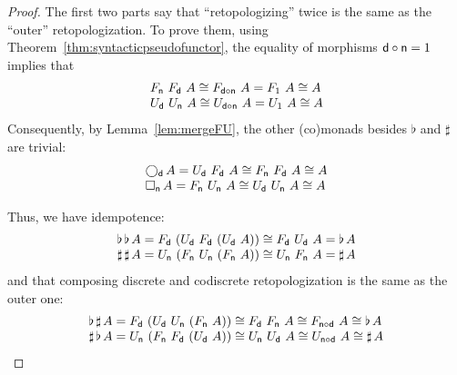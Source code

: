 \documentclass{drl-common/llncs}
\newcommand\compo[2]{\ensuremath{#1 \circ #2}}
\newcommand\F[2]{\ensuremath{F_{#1} \,\, #2}}
\newcommand\U[2]{\ensuremath{U_{#1} \,\, #2}}
\newcommand\Bx[2]{\ensuremath{\Box_{#1} \, {#2}}}
\newcommand\Crc[2]{\ensuremath{\bigcirc_{#1} \, {#2}}}
\newcommand\Flat[1]{\ensuremath{\flat \, {#1}}}
\newcommand\Sharp[1]{\ensuremath{\sharp \, {#1}}}
\begin{document}
\begin{proof}

The first two parts say that ``retopologizing'' twice is the same as the
``outer'' retopologization.  To prove them, using
Theorem~\ref{thm:syntacticpseudofunctor}, the equality of morphisms
$\compo{\dsd d}{\dsd n} = 1$ implies that
\[
\begin{array}{l}
\F{\dsd{n}}{\F{\dsd{d}}{A}} \iso \F{\compo{\dsd d}{\dsd n}}{A} = \F{1}{A} \iso A\\
\U{\dsd{d}}{\U{\dsd{n}}{A}} \iso \U{\compo{\dsd d}{\dsd n}}{A} = \U{1}{A} \iso A\\
\end{array}
\]
Consequently, by Lemma~\ref{lem:mergeFU},
the other (co)monads besides $\flat$ and $\sharp$ are
trivial: 
\[
\begin{array}{l}
\Crc{\dsd{d}}{A} = \U{\dsd{d}}{\F{\dsd d}{A}} \iso \F{\dsd n}{\F{\dsd d}{A}} \iso A\\
\Bx{\dsd{n}}{A} = \F{\dsd{n}}{\U{\dsd n}{A}} \iso \U{\dsd d}{\U{\dsd n}{A}} \iso A
\end{array}
\]

Thus, we have idempotence:
\[
\begin{array}{l}
\Flat{\Flat A} = \F{\dsd d}{(\U {\dsd d} {\F{\dsd d}{(\U {\dsd d} A)}})} \cong \F{\dsd d}{\U {\dsd d} A} = \Flat A\\
\Sharp{\Sharp A} = \U{\dsd n}{(\F {\dsd n} {\U{\dsd n}{(\F {\dsd n} A)}})} \cong \U{\dsd n}{\F {\dsd n} A} = \Sharp A
\end{array}
\]
and that composing discrete and codiscrete retopologization is the same
as the outer one:
\[
\begin{array}{l}
\Flat{\Sharp A} = \F{\dsd d}{(\U{\dsd d}{\U{\dsd n}{(\F{\dsd n}{A})}})} 
\cong \F{\dsd d}{\F{\dsd n}{A}}
\cong \F{\compo{\dsd n}{\dsd d}}{A} \cong \Flat A \\

\Sharp{\Flat A} = \U{\dsd n}{(\F{\dsd n}{\F{\dsd d}{(\U{\dsd d}{A})}})} 
\cong \U{\dsd n}{\U{\dsd d}{A}}
\cong \U{\compo{\dsd n}{\dsd d}}{A} \cong \Sharp A \\
\end{array}
\]


\end{proof}
\end{document}

